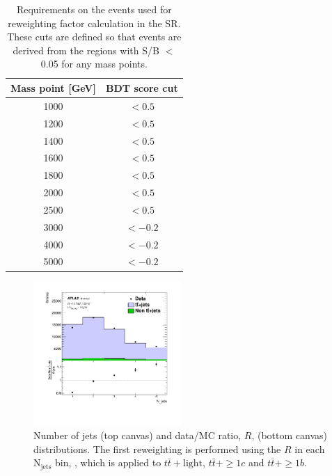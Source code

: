 \begin{table}[H]
  \centering
  \begin{tabular*}{70mm}{@{\extracolsep{\fill}}cc}
    \hline\hline
    Mass point [GeV] & BDT score cut\\
    \hline
    1000             & $< 0.5$\\
    1200             & $< 0.5$\\
    1400             & $< 0.5$\\
    1600             & $< 0.5$\\
    1800             & $< 0.5$\\
    2000             & $< 0.5$\\
    2500             & $< 0.5$\\
    3000             & $<-0.2$\\
    4000             & $<-0.2$\\
    5000             & $<-0.2$\\
    \hline\hline
  \end{tabular*}
  \caption{Requirements on the events used for reweighting factor calculation in the SR. These cuts are defined so that events are derived from the regions with S/B $<$ 0.05 for any mass points.}
  \label{tab:ReqForRWControlRegion}
\end{table}

\begin{figure}[H]
    \centering
    \includegraphics[width=0.50\textwidth]{images/BkgModeling/RWFactors_Njets.png}
    \caption{Number of jets (top canvas) and data/MC ratio, $R$, (bottom canvas) distributions. The first reweighting is performed using the $R$ in each $\text{N}_{\text{jets}}$ bin, , which is applied to $t\bar{t}+\text{light}$, $t\bar{t}+\geq1c$ and $t\bar{t}+\geq1b$.}
    \label{fig:RWFactors_Njets_CR}
\end{figure}

